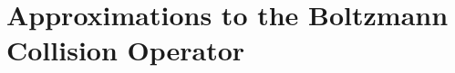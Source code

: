 \documentclass[../main.tex]{subfiles}
\begin{document}
\chapter{Approximations to the Boltzmann Collision Operator}






\end{document}
